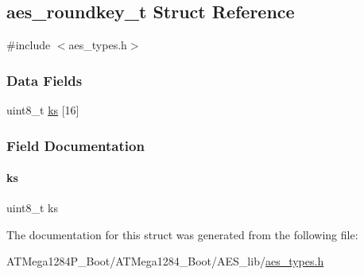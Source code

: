 \hypertarget{structaes__roundkey__t}{}\subsection{aes\+\_\+roundkey\+\_\+t Struct Reference}
\label{structaes__roundkey__t}


{\ttfamily \#include $<$aes\+\_\+types.\+h$>$}

\subsubsection*{Data Fields}
\begin{DoxyCompactItemize}
\item 
uint8\+\_\+t \hyperlink{structaes__roundkey__t_afb51864ee29c14bb192fa9f815ff4e98}{ks} \mbox{[}16\mbox{]}
\end{DoxyCompactItemize}


\subsubsection{Field Documentation}
\mbox{\label{structaes__roundkey__t_afb51864ee29c14bb192fa9f815ff4e98}} 
\paragraph{\texorpdfstring{ks}{ks}}
{\footnotesize\ttfamily uint8\+\_\+t ks}



The documentation for this struct was generated from the following file\+:\begin{DoxyCompactItemize}
\item 
A\+T\+Mega1284\+P\+\_\+\+Boot/\+A\+T\+Mega1284\+\_\+\+Boot/\+A\+E\+S\+\_\+lib/\hyperlink{_a_t_mega1284_p___boot_2_a_t_mega1284___boot_2_a_e_s__lib_2aes__types_8h}{aes\+\_\+types.\+h}\end{DoxyCompactItemize}

